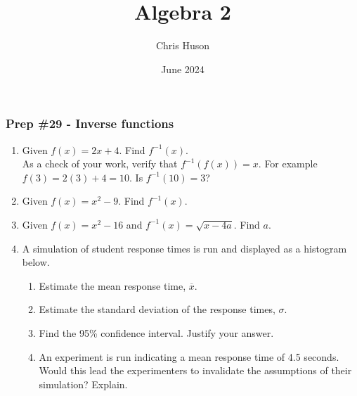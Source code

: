 \documentclass[12pt, twoside]{article}
\title{Algebra 2}
\author{Chris Huson}
\date{June 2024}
\begin{document}
\subsubsection*{Prep \#29 - Inverse functions}
\begin{enumerate}
\item Given $f(x)=2x+4$. Find $f^{-1}(x)$. \\[4cm]
    As a check of your work, verify that $f^{-1}(f(x))=x$. For example $f(3)=2(3)+4=10$. Is $f^{-1}(10)=3$? \vspace{3cm}

\item Given $f(x)=x^2-9$. Find $f^{-1}(x)$. \vspace{4cm}

\item Given $f(x)=x^2-16$ and $f^{-1}(x) = \sqrt{x-4a}$. Find $a$.

\newpage

\item A simulation of student response times is run and displayed as a histogram below. \\[0.25cm]
    \begin{center}
    \end{center}
    \begin{enumerate}[itemsep=2cm]
        \item Estimate the mean response time, $\overline{x}$.
        \item Estimate the standard deviation of the response times, $\sigma$.
        \item Find the 95\% confidence interval. Justify your answer.
        \item An experiment is run indicating a mean response time of 4.5 seconds. Would this lead the experimenters to invalidate the assumptions of their simulation? Explain.
    \end{enumerate}


\end{enumerate}
\end{document}
